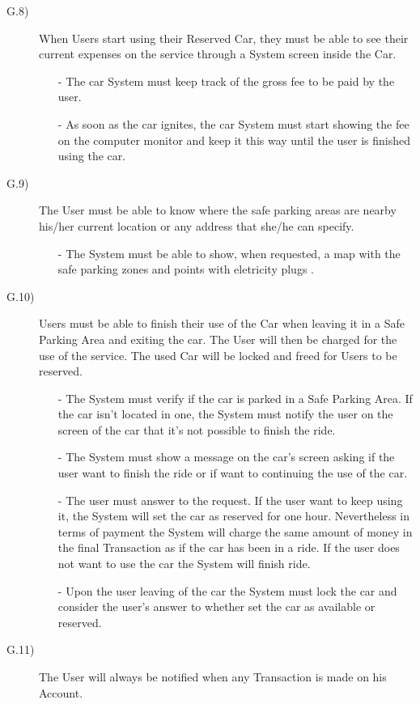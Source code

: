 \documentclass[a4paper]{article}
\begin{document}
\begin{description}
\begin{itemize}
\end{itemize}
\item [G.8)]When Users start using their Reserved Car, they must be able to see their current expenses on the service through a System screen inside the Car.
\begin{itemize}
	\item[-]The car System must keep track of the gross fee to be paid by the user.
	\item[-]As soon as the car ignites, the car System must start showing the fee on the computer monitor and keep it this way until the user is finished using the car.
\end{itemize}
\item [G.9)]The User must be able to know where the safe parking areas are nearby his/her current location or any address that she/he can specify.
\begin{itemize}
	\item[-]The System must be able to show, when requested, a map with the safe parking zones and points with eletricity plugs .
\end{itemize}
\item [G.10)]Users must be able to finish their use of the Car when leaving it in a Safe Parking Area and exiting the car. The User will then be charged for the use of the service. The used Car will be locked and freed for Users to be reserved.
\begin{itemize}
	\item[-]The System must verify if the car is parked in a Safe Parking Area. If the car isn't located in one, the System must notify the user on the screen of the car that it's not possible to finish the ride.
	\item[-]The System must show a message on the car's screen asking if the user want to finish the ride or if want to continuing the use of the car.
	\item[-]The user must answer to the request. If the user want to keep using it, the System will set the car as reserved for one hour. Nevertheless in terms of payment the System will charge the same amount of money in the final Transaction as if the car has been in a ride. If the user does not want to use the car the System will finish ride.
	\item[-]Upon the user leaving of the car the System must lock the car and consider the user's answer to whether set the car as available or reserved.
\end{itemize}
\item [G.11)]The User will always be notified when any Transaction is made on his Account.

\end{description}
\end{document}
